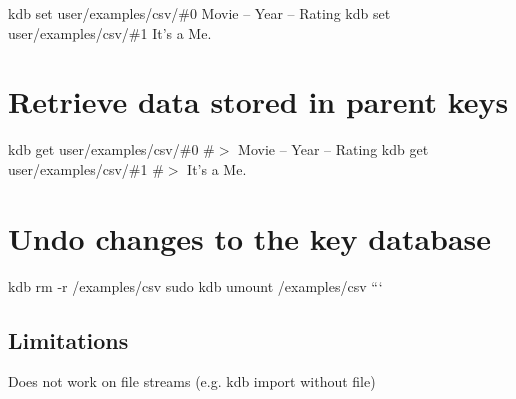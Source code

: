 kdb set user/examples/csv/\#0 \textquotesingle{}Movie – Year – Rating\textquotesingle{} kdb set user/examples/csv/\#1 \textquotesingle{}It’s a Me.\textquotesingle{}

\section*{Retrieve data stored in parent keys}

kdb get user/examples/csv/\#0 \#$>$ Movie – Year – Rating kdb get user/examples/csv/\#1 \#$>$ It’s a Me.

\section*{Undo changes to the key database}

kdb rm -\/r /examples/csv sudo kdb umount /examples/csv ```

\subsection*{Limitations}


\begin{DoxyItemize}
\item Does not work on file streams (e.\+g. {\ttfamily kdb import} without file) 
\end{DoxyItemize}